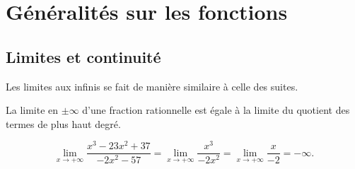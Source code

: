 
\TCDLessonStyleOn
\newcommand{\Df}{\mathcal{D}_f}

\chapter{G\'en\'eralit\'es sur les fonctions}
\section{Limites et continuit\'e}
      \begin{prop}
            Les limites aux infinis se fait de mani\`ere similaire \`a celle des suites.
            
            La limite en $\pm\infty$ d'une fraction rationnelle est \'egale \`a la limite du quotient des termes de plus haut degr\'e.
            \begin{ex}
                  \[
                  \lim_{x\rightarrow+\infty} \frac{x^3-23x^2+37}{-2x^2-57} = \lim_{x\rightarrow+\infty} \frac{x^3}{-2x^2} 
                                                                           = \lim_{x\rightarrow+\infty} \frac{x}{-2}      
                                                                           = -\infty	.
                  \]
            \end{ex}
      \end{prop}
%
